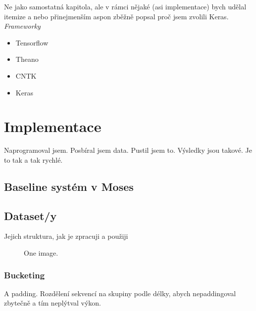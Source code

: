 Ne jako samostatná kapitola, ale v rámci nějaké (asi implementace) bych udělal itemize a nebo přinejmenším aspon zběžně popsal proč jsem zvolili Keras.
\emph{Frameworky}
\begin{itemize}
  \item Tensorflow
  \item Theano
  \item CNTK
  \item Keras
\end{itemize}


\chapter{Implementace}
Naprogramoval jsem.
Posbíral jsem data.
Pustil jsem to.
Výsledky jsou takové.
Je to tak a tak rychlé.

\section{Baseline systém v Moses}

\section{Dataset/y}
Jejich struktura, jak je zpracuji a použiji
\begin{figure}
    \begin{center}
    \end{center}
	\caption{One image. }
	\label{img:TODO}
\end{figure}


\subsection{Bucketing}
A padding. Rozdělení sekvencí na skupiny podle délky, abych nepaddingoval zbytečně a tím neplýtval výkon. 

